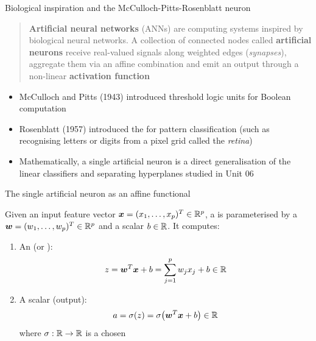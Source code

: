 \documentclass[aspectratio=169]{beamer}\usepackage[]{graphicx}\usepackage[]{xcolor}
\begin{document}
\begin{frame}{Biological inspiration and the McCulloch-Pitts-Rosenblatt neuron}
\begin{quote}
\textbf{Artificial neural networks} (ANNs) are computing systems inspired by biological neural networks. A collection of connected nodes called \textbf{artificial neurons} receive real-valued signals along weighted edges (\emph{synapses}), aggregate them via an affine combination and emit an output through a non-linear \textbf{activation function}
\end{quote}
\vfill
\begin{itemize}
\item McCulloch and Pitts (1943) introduced threshold logic units for Boolean computation
\vfill
\item Rosenblatt (1957) introduced the  for pattern classification (such as recognising letters or digits from a pixel grid called the \emph{retina})
\vfill
\item Mathematically, a single artificial neuron is a direct generalisation of the linear classifiers and separating hyperplanes studied in Unit 06
\end{itemize}
\end{frame}


\begin{frame}{The single artificial neuron as an affine functional}
\begin{importantdefinition}
\label{def:single-neuron}
Given an input feature vector $\bm{x} = (x_1, \ldots, x_p)^T \in \mathbb{R}^p$, a  is parameterised by a  $\bm{w} = (w_1, \ldots, w_p)^T \in \mathbb{R}^p$ and a scalar  $b \in \mathbb{R}$. It computes:
\begin{enumerate}
\item An  (or ):
\[
z = \bm{w}^T \bm{x} + b = \sum_{j=1}^p w_j x_j + b \in \mathbb{R}
\]
\item A scalar  (output):
\[
a = \sigma(z) = \sigma\big(\bm{w}^T \bm{x} + b\big) \in \mathbb{R}
\]
where $\sigma: \mathbb{R} \to \mathbb{R}$ is a chosen 
\end{enumerate}
\end{importantdefinition}
\end{frame}
\end{document}
